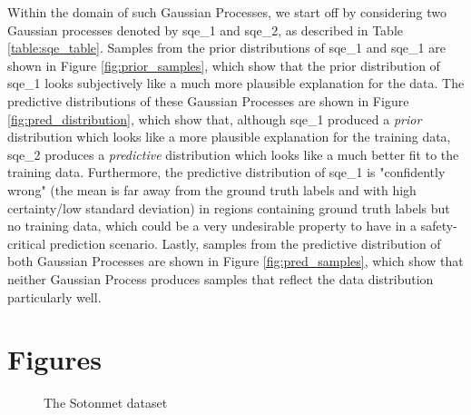 \documentclass{article}
\begin{document}
Within the domain of such Gaussian Processes, we start off by considering two Gaussian processes denoted by sqe\_1 and sqe\_2, as described in Table \ref{table:sqe_table}. Samples from the prior distributions of sqe\_1 and sqe\_1 are shown in Figure \ref{fig:prior_samples}, which show that the prior distribution of sqe\_1 looks subjectively like a much more plausible explanation for the data. The predictive distributions of these Gaussian Processes are shown in Figure \ref{fig:pred_distribution}, which show that, although sqe\_1 produced a \emph{prior} distribution which looks like a more plausible explanation for the training data, sqe\_2 produces a \emph{predictive} distribution which looks like a much better fit to the training data. Furthermore, the predictive distribution of sqe\_1 is "confidently wrong" (the mean is far away from the ground truth labels and with high certainty/low standard deviation) in regions containing ground truth labels but no training data, which could be a very undesirable property to have in a safety-critical prediction scenario. Lastly, samples from the predictive distribution of both Gaussian Processes are shown in Figure \ref{fig:pred_samples}, which show that neither Gaussian Process produces samples that reflect the data distribution particularly well.

\appendix

\section{Figures}\label{appendix:figures}


\begin{figure}[pht]
    \centering
    \caption{The Sotonmet dataset}
    \label{fig:sotonmet}
\end{figure}
\end{document}
